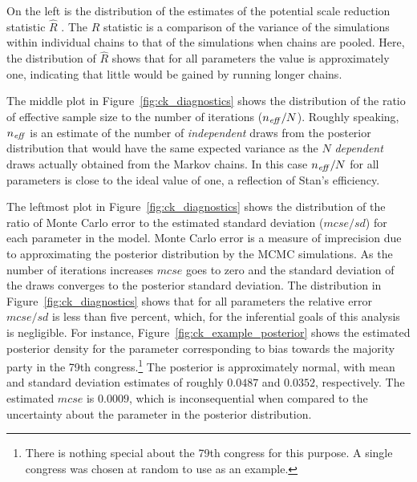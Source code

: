 On the left is the distribution of the estimates of the potential scale reduction statistic $\hat{R}$  . The $\hat{R}$ statistic is a comparison of the variance of the simulations within individual chains to that of the simulations when chains are pooled. Here, the distribution of $\hat{R}$ shows that for all parameters the value is approximately one, indicating that little would be gained by running longer chains. 

The middle plot in Figure~\ref{fig:ck_diagnostics} shows the distribution of the ratio of effective sample size to the number of iterations ($n_{\it eff}/N$). Roughly speaking, $n_{\it eff}$ is an estimate of the number of {\it independent} draws from the posterior distribution that would have the same expected variance as the $N$ {\it dependent} draws actually obtained from the Markov chains. In this case $n_{\it eff}/N$ for all parameters is close to the ideal value of one, a reflection of Stan's efficiency. 


The leftmost plot in Figure~\ref{fig:ck_diagnostics} shows the distribution of the ratio of Monte Carlo error to the estimated standard deviation ($mcse/sd$) for each parameter in the model. Monte Carlo error is a measure of imprecision due to approximating the posterior distribution by the MCMC simulations. As the number of iterations increases $mcse$ goes to zero and the standard deviation of the draws converges to the posterior standard deviation. The distribution in Figure~\ref{fig:ck_diagnostics} shows that for all parameters the relative error $mcse/sd$ is less than five percent, which, for the inferential goals of this analysis is negligible. For instance, Figure~\ref{fig:ck_example_posterior} shows the estimated posterior density for the parameter corresponding to bias towards the majority party in the 79th congress.\footnote{There is nothing special about the 79th congress for this purpose. A single congress was chosen at random to use as an example.} The posterior is approximately normal, with mean and standard deviation estimates of roughly $0.0487$ and $0.0352$, respectively. The estimated $mcse$ is $0.0009$, which is inconsequential when compared to the uncertainty about the parameter in the posterior distribution.   

